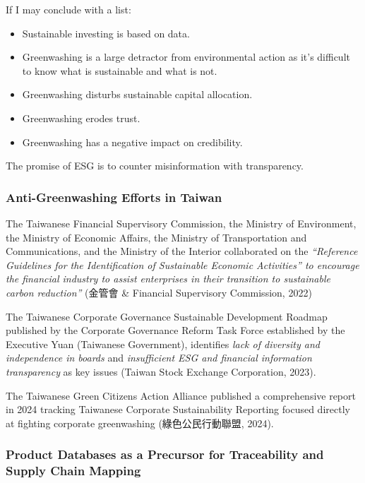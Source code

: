 \documentclass[
  12pt,
  letterpaper,
  DIV=11,
  numbers=noendperiod]{scrartcl}
\providecommand{\tightlist}{%
  \setlength{\itemsep}{0pt}\setlength{\parskip}{0pt}}
\begin{document}
If I may conclude with a list:

\begin{itemize}
\tightlist
\item
  Sustainable investing is based on data.
\item
  Greenwashing is a large detractor from environmental action as it's
  difficult to know what is sustainable and what is not.
\item
  Greenwashing disturbs sustainable capital allocation.
\item
  Greenwashing erodes trust.
\item
  Greenwashing has a negative impact on credibility.
\end{itemize}

The promise of ESG is to counter misinformation with transparency.

\subsubsection{Anti-Greenwashing Efforts in
Taiwan}\label{anti-greenwashing-efforts-in-taiwan}

The Taiwanese Financial Supervisory Commission, the Ministry of
Environment, the Ministry of Economic Affairs, the Ministry of
Transportation and Communications, and the Ministry of the Interior
collaborated on the \emph{``Reference Guidelines for the Identification
of Sustainable Economic Activities'' to encourage the financial industry
to assist enterprises in their transition to sustainable carbon
reduction''} (金管會 \& Financial Supervisory Commission, 2022)

The Taiwanese Corporate Governance Sustainable Development Roadmap
published by the Corporate Governance Reform Task Force established by
the Executive Yuan (Taiwanese Government), identifies \emph{lack of
diversity and independence in boards} and \emph{insufficient ESG and
financial information transparency} as key issues (Taiwan Stock Exchange
Corporation, 2023).

The Taiwanese Green Citizens Action Alliance published a comprehensive
report in 2024 tracking Taiwanese Corporate Sustainability Reporting
focused directly at fighting corporate greenwashing (綠色公民行動聯盟,
2024).

\subsubsection{Product Databases as a Precursor for Traceability and
Supply Chain
Mapping}\label{product-databases-as-a-precursor-for-traceability-and-supply-chain-mapping}
\end{document}
